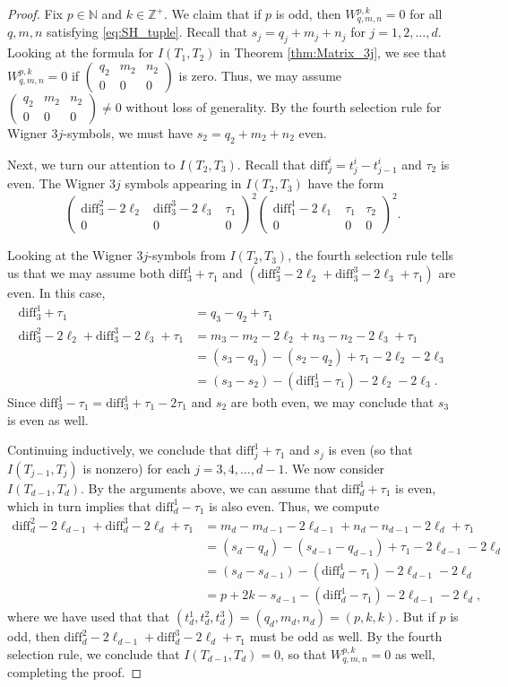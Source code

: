 \documentclass[11pt]{amsart}
\theoremstyle{definition}
\theoremstyle{plain}
\theoremstyle{remark}
\newcommand{\Z}{\mathbb{Z}}
\newcommand{\N}{\mathbb{N}}
\newcommand{\mat}[6]{\begin{pmatrix} #1 & #2 & #3 \\ #4 & #5 & #6 \end{pmatrix}}
\newcommand{\diff}{\mathrm{diff}}
\begin{document}
\begin{proof} 
Fix $p\in\N$ and $k\in\Z^+$. We claim that if $p$ is odd, then $W^{p, k}_{q, m, n} = 0$ for all $q, m, n$ satisfying \eqref{eq:SH_tuple}. Recall that $s_j = q_j + m_j + n_j$ for $j = 1, 2, \dots, d$. Looking at the formula for $I(T_1, T_2)$ in Theorem \ref{thm:Matrix_3j}, we see that $W^{p, k}_{q, m, n} = 0$ if $\mat{q_2}{m_2}{n_2}{0}{0}{0}$ is zero. Thus, we may assume $\mat{q_2}{m_2}{n_2}{0}{0}{0} \neq 0$ without loss of generality. By the fourth selection rule for Wigner $3j$-symbols, we must have $s_2 = q_2 + m_2 + n_2$ even. 

Next, we turn our attention to $I(T_2, T_3)$. Recall that $\diff_j^i = t_j^i - t_{j - 1}^i$ and $\tau_2$ is even. The Wigner $3j$ symbols appearing in $I(T_2, T_3)$ have the form 
\begin{equation*} 
\mat{\diff_3^2 - 2\ell_2}{\diff_3^3 - 2\ell_3}{\tau_1}{0}{0}{0}^2\mat{\diff_1^1 - 2\ell_1}{\tau_1}{\tau_2}{0}{0}{0}^2. 
\end{equation*} 

Looking at the Wigner $3j$-symbols from $I(T_2, T_3)$, the fourth selection rule tells us that we may assume both $\diff_3^1 + \tau_1$ and $(\diff_3^2 - 2\ell_2 + \diff_3^3 - 2\ell_3 + \tau_1)$ are even. In this case, 
\begin{align*} 
\diff_3^1 + \tau_1 & = q_3 - q_2 + \tau_1 \\ 
\diff_3^2 - 2\ell_2 + \diff_3^3 - 2\ell_3 + \tau_1 & = m_3 - m_2 - 2\ell_2 + n_3 - n_2 - 2\ell_3 + \tau_1 \\ 
& = (s_3 - q_3) - (s_2 - q_2) + \tau_1 - 2\ell_2 - 2\ell_3 \\ 
& = (s_3 - s_2) - (\diff_3^1 - \tau_1) - 2\ell_2 - 2\ell_3.
\end{align*} 
Since $\diff_3^1 - \tau_1 = \diff_3^1 + \tau_1 - 2\tau_1$ and $s_2$ are both even, we may conclude that $s_3$ is even as well. 

Continuing inductively, we conclude that $\diff_j^1 + \tau_1$ and $s_j$ is even (so that $I(T_{j - 1}, T_j)$ is nonzero) for each $j = 3, 4, \dots, d - 1$.  We now consider $I(T_{d-1}, T_d)$.  By the arguments above, we can assume that $\diff_d^1 + \tau_1$ is even, which in turn implies that $\diff_d^1 - \tau_1$ is also even. Thus, we compute 
\begin{align*} 
\diff_d^2 - 2\ell_{d-1} + \diff_d^3 - 2\ell_d + \tau_1 & = m_d - m_{d-1} - 2\ell_{d-1} + n_d - n_{d-1} - 2\ell_d + \tau_1 \\
& = (s_d - q_d) - (s_{d-1} - q_{d-1}) + \tau_1 - 2\ell_{d-1} - 2\ell_d \\
& = (s_d - s_{d-1}) - (\diff_d^1 - \tau_1) - 2\ell_{d-1} - 2\ell_d \\
& = p + 2k - s_{d-1} - (\diff_d^1 - \tau_1) - 2\ell_{d-1} - 2\ell_d ,
\end{align*}
where we have used that that $(t_d^1 , t_d^2 , t_d^3) = (q_d, m_d, n_d) = (p, k ,k)$.  But if $p$ is odd, then $\diff_d^2 - 2\ell_{d-1} + \diff_d^3 - 2\ell_d + \tau_1$ must be odd as well.  By the fourth selection rule, we conclude that $I(T_{d-1},T_d)=0$, so that $W^{p,k}_{q,m,n} = 0$ as well, completing the proof.
\end{proof} 
\end{document}
